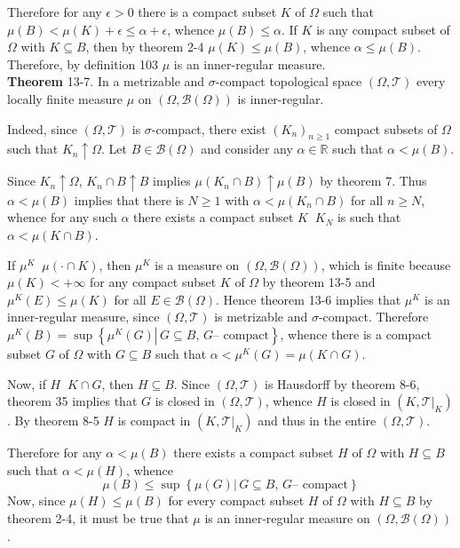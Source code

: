 \documentclass[a4paper]{article}
\newcommand{\obj}[1]{\left\{ #1 \right \}}
\newcommand{\brac}[1]{\left ( #1 \right )}
\newcommand{\induc}[1]{\left . #1 \right \vert}
\newcommand{\Real}{\mathbb{R}}
\newcommand{\Tcal}{\mathcal{T}}
\newcommand{\borel}[1]{\mathcal{B}\brac{#1}}
\newcommand{\defn}{\mathop{\overset{\Delta}{=}}\nolimits}
\begin{document}
Therefore for any $\epsilon>0$ there is a compact subset $K$ of $\Omega$ such that $\mu\brac{B} < \mu\brac{K} + \epsilon \leq \alpha + \epsilon$, whence $\mu\brac{B}\leq \alpha$. If $K$ is any compact subset of $\Omega$ with $K\subseteq B$, then by theorem 2-4 $\mu\brac{K}\leq \mu\brac{B}$, whence $\alpha \leq \mu\brac{B}$. Therefore, by definition 103 $\mu$ is an inner-regular measure.\\

\label{thm:metr_sig_comp_local_finite} \noindent \textbf{Theorem} 13-7.
In a metrizable and $\sigma$-compact topological space $\brac{\Omega,\Tcal}$ every locally finite measure $\mu$ on $\brac{\Omega,\borel{\Omega}}$ is inner-regular.

Indeed, since $\brac{\Omega,\Tcal}$ is $\sigma$-compact, there exist $\brac{K_n}_{n\geq1}$ compact subsets of $\Omega$ such that $K_n\uparrow \Omega$. Let $B\in \borel{\Omega}$ and consider any $\alpha\in\Real$ such that $\alpha < \mu\brac{B}$.

Since $K_n\uparrow \Omega$, $K_n\cap B\uparrow B$ implies $\mu\brac{K_n\cap B}\uparrow \mu\brac{B}$ by theorem 7. Thus $\alpha<\mu\brac{B}$ implies that there is $N\geq 1$ with $\alpha < \mu\brac{K_n\cap B}$ for all $n\geq N$, whence for any such $\alpha$ there exists a compact subset $K\defn K_N$ is such that $\alpha<\mu\brac{K\cap B}$.

If $\mu^K\defn \mu\brac{\cdot \cap K}$, then $\mu^K$ is a measure on $\brac{\Omega,\borel{\Omega}}$, which is finite because $\mu\brac{K}<+\infty$ for any compact subset $K$ of $\Omega$ by theorem 13-5 and $\mu^K\brac{E}\leq \mu\brac{K}$ for all $E\in\borel{\Omega}$. Hence theorem 13-6 implies that $\mu^K$ is an inner-regular measure, since $\brac{\Omega,\Tcal}$ is metrizable and $\sigma$-compact. Therefore $\mu^K\brac{B}=\sup\obj{\induc{\mu^K\brac{G}}\,G\subseteq B,\,G\text{-- compact}}$, whence there is a compact subset $G$ of $\Omega$ with $G\subseteq B$ such that $\alpha < \mu^K\brac{G} = \mu\brac{K\cap G}$.

Now, if $H\defn K\cap G$, then $H\subseteq B$. Since $\brac{\Omega,\Tcal}$ is Hausdorff by theorem 8-6, theorem 35 implies that $G$ is closed in $\brac{\Omega,\Tcal}$, whence $H$ is closed in $\brac{K,\induc{\Tcal}_K}$. By theorem 8-5 $H$ is compact in $\brac{K,\induc{\Tcal}_K}$ and thus in the entire $\brac{\Omega,\Tcal}$.

Therefore for any $\alpha<\mu\brac{B}$ there exists a compact subset $H$ of $\Omega$ with $H\subseteq B$ such that $\alpha<\mu\brac{H}$, whence \[\mu\brac{B}\leq \sup\obj{\induc{\mu\brac{G}}\,G\subseteq B,\,G\text{-- compact}}\] Now, since $\mu\brac{H}\leq \mu\brac{B}$ for every compact subset $H$ of $\Omega$ with $H\subseteq B$ by theorem 2-4, it must be true that $\mu$ is an inner-regular measure on $\brac{\Omega,\borel{\Omega}}$.\\
\end{document}
